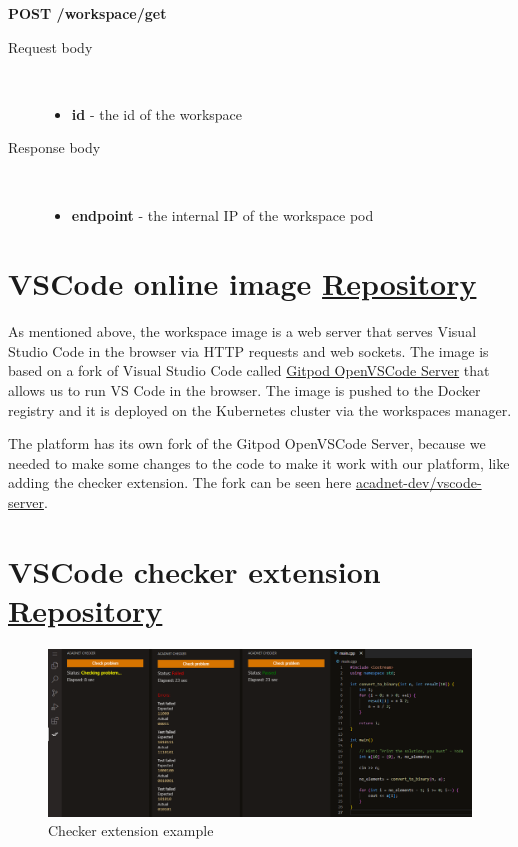 \documentclass[12pt,a4paper]{report}
\begin{document}
\textbf{POST /workspace/get}
\begin{description}
	\item[Request body]\
		\begin{itemize}
			\item \textbf{id} - the id of the workspace
		\end{itemize}
	\item[Response body]\
		\begin{itemize}
			\item \textbf{endpoint} - the internal IP of the workspace pod
		\end{itemize}
\end{description}

\section{VSCode online image \href{https://github.com/acadnet-dev/vscode-server}{ Repository}}
As mentioned above, the workspace image is a web server that serves Visual Studio Code in the browser via HTTP requests and web sockets. The image is based on a fork of Visual Studio Code called \href{https://github.com/gitpod-io/openvscode-server}{Gitpod OpenVSCode Server} that allows us to run VS Code in the browser. The image is pushed to the Docker registry and it is deployed on the Kubernetes cluster via the workspaces manager.

The platform has its own fork of the Gitpod OpenVSCode Server, because we needed to make some changes to the code to make it work with our platform, like adding the checker extension. The fork can be seen here \href{https://github.com/acadnet-dev/vscode-server}{acadnet-dev/vscode-server}.

\section{VSCode checker extension \href{https://github.com/acadnet-dev/vscode-checker-extension}{\faicon{github} Repository}}

\begin{figure}[h]
	\centering
	\includegraphics[width=\linewidth]{./pics/checker-extension.png}
	\caption{Checker extension example}
	\label{fig:checker-extension}
\end{figure}
\end{document}
